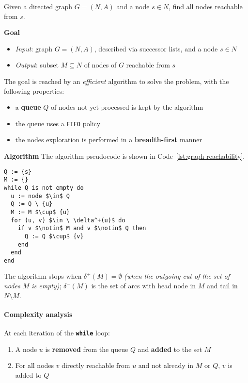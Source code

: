\documentclass[english]{article}
\begin{document}
\begin{definition}
  Given a directed graph \(G = (N, A)\) and a node \(s \in N\), find all nodes reachable from \(s\).
\end{definition}

\bigskip
\textbf{Goal}
\begin{itemize}[label=\(\rightarrow\)]
  \item \textit{Input}: graph \(G = (N, A)\), described via successor lists, and a node \(s \in N\)
  \item \textit{Output}: subset \(M \subseteq N\) of nodes of \(G\) reachable from \(s\)
\end{itemize}

The goal is reached by an \textit{efficient} algorithm to solve the problem, with the following properties:
\begin{itemize}
  \item a \textbf{queue} \(Q\) of nodes not yet processed is kept by the algorithm
  \item the queue uses a \texttt{FIFO} policy
  \item the nodes exploration is performed in a \textbf{breadth-first} manner
\end{itemize}

\bigskip
\textbf{Algorithm}
The algorithm pseudocode is shown in Code~\ref{lst:graph-reachability}.

\begin{lstlisting}[style=custom, language=pseudocode, caption={Graph reachability}, label={lst:graph-reachability}, float]
Q := {s}
M := {}
while Q is not empty do
  u := node $\in$ Q
  Q := Q \ {u}
  M := M $\cup$ {u}
  for (u, v) $\in \ \delta^+(u)$ do
    if v $\notin$ M and v $\notin$ Q then
      Q := Q $\cup$ {v}
    end
  end
end
\end{lstlisting}

The algorithm stops when \(\delta^+(M) = \emptyset\) \textit{(when the outgoing cut of the set of nodes \(M\) is empty)};
\(\delta^-(M)\) is the set of arcs with head node in \(M\) and tail in \(N \setminus M\).

\paragraph{Complexity analysis}

At each iteration of the \texttt{\textbf{while}} loop:

\begin{enumerate}
  \item A node \(u\) is \textbf{removed} from the queue \(Q\) and \textbf{added} to the set \(M\)
  \item For all nodes \(v\) directly reachable from \(u\) and not already in \(M\) or \(Q\), \(v\) is added to \(Q\)
\end{enumerate}
\end{document}
